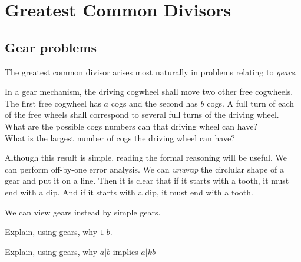 
\chapter{Greatest Common Divisors}





\section{Gear problems}

The greatest common divisor arises most naturally in problems relating to \textit{gears}. 

In a gear mechanism, the driving cogwheel shall move two other free cogwheels.
The first free cogwheel has $a$ cogs and the second has $b$ cogs. 
A full turn of each of the free wheels shall correspond to several full 
turns of the driving wheel. \\
What are the possible cogs numbers can that driving wheel can have? \\
What is the largest number of cogs the driving wheel can have?\\


Although this result is simple, reading the formal reasoning will be useful.  
We can perform off-by-one error analysis. We can \textit{unwrap} the 
circlular shape of a gear and put it on a line. Then it is clear 
that if it starts with a tooth, it must end with a dip. And if 
it starts with a dip, it must end with a tooth. 

\frmrule

We can view gears instead by simple gears. 



\frmrule

\begin{example}
Explain, using gears, why $1 | b$.
\end{example}

\frmrule

\begin{example}
Explain, using gears, why $a | b$ implies $a | kb$
\end{example}

\frmrule

